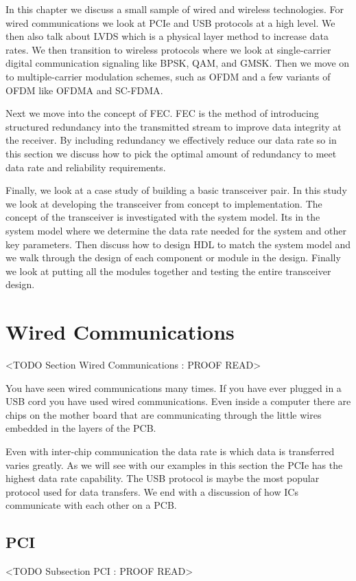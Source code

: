 In this chapter we discuss a small sample of wired and wireless technologies. For wired communications we look at \ac{PCIe} and \ac{USB} protocols at a high level. We then also talk about \ac{LVDS} which is a physical layer method to increase data rates. We then transition to wireless protocols where we look at single-carrier digital communication signaling like \ac{BPSK}, \ac{QAM}, and \ac{GMSK}. Then we move on to multiple-carrier modulation schemes, such as \ac{OFDM} and a few variants of \ac{OFDM} like \ac{OFDMA} and \ac{SC-FDMA}.

Next we move into the concept of \ac{FEC}. \ac{FEC} is the method of introducing structured redundancy into the transmitted stream to improve data integrity at the receiver. By including redundancy we effectively reduce our data rate so in this section we discuss how to pick the optimal amount of redundancy to meet data rate and reliability requirements.

Finally, we look at a case study of building a basic transceiver pair. In this study we look at developing the transceiver from concept to implementation. The concept of the transceiver is investigated with the system model. Its in the system model where we determine the data rate needed for the system and other key parameters. Then discuss how to design \ac{HDL} to match the system model and we walk through the design of each component or module in the design. Finally we look at putting all the modules together and testing the entire transceiver design. 

\section{Wired Communications}
	<TODO Section Wired Communications : PROOF READ>

You have seen wired communications many times. If you have ever plugged in a \ac{USB} cord you have used wired communications. Even inside a computer there are chips on the mother board that are communicating through the little wires embedded in the layers of the \ac{PCB}.	
	
Even with inter-chip communication the data rate is which data is transferred varies greatly. As we will see with our examples in this section the \ac{PCIe} has the highest data rate capability. The \ac{USB} protocol is maybe the most popular protocol used for data transfers. We end with a discussion of how \ac{IC}s communicate with each other on a \ac{PCB}.
	
\subsection{PCI}
	<TODO Subsection PCI : PROOF READ>

